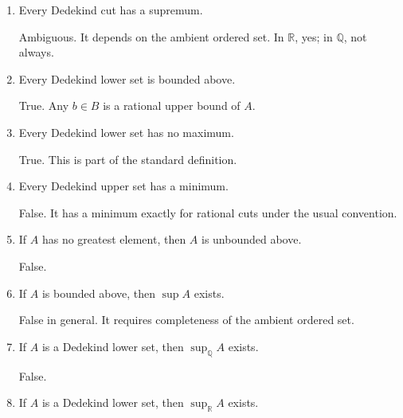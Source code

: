 \documentclass{self-check}
\begin{document}
\begin{enumerate}[label=\arabic*., itemsep=10pt]

\item Every Dedekind cut has a supremum.

\begin{answer}
Ambiguous. It depends on the ambient ordered set. In $\mathbb{R}$, yes; in $\mathbb{Q}$, not always.
\end{answer}

\item Every Dedekind lower set is bounded above.

\begin{answer}
True. Any $b\in B$ is a rational upper bound of $A$.
\end{answer}

\item Every Dedekind lower set has no maximum.

\begin{answer}
True. This is part of the standard definition.
\end{answer}

\item Every Dedekind upper set has a minimum.

\begin{answer}
False. It has a minimum exactly for rational cuts under the usual convention.
\end{answer}

\item If $A$ has no greatest element, then $A$ is unbounded above.

\begin{answer}
False.
\end{answer}

\item If $A$ is bounded above, then $\sup A$ exists.

\begin{answer}
False in general. It requires completeness of the ambient ordered set.
\end{answer}

\item If $A$ is a Dedekind lower set, then $\sup_{\mathbb{Q}}A$ exists.

\begin{answer}
False.
\end{answer}

\item If $A$ is a Dedekind lower set, then $\sup_{\mathbb{R}}A$ exists.


\end{enumerate}
\end{document}
